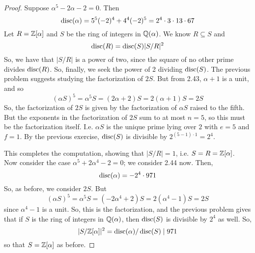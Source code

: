 \begin{proof}
	Suppose $\alpha^5 - 2\alpha - 2 = 0$. Then
	\[ \operatorname{disc}(\alpha) = 5^5(-2)^4 + 4^4(-2)^5 = 2^4 \cdot 3 \cdot 13 \cdot 67 \]
	Let $R = \mathbb{Z}[\alpha]$ and $S$ be the ring of integers in $\mathbb{Q}(\alpha)$. We know $R \subseteq S$ and
	\[ \operatorname{disc}(R) = \operatorname{disc}(S)|S/R|^2 \]
	So, we have that $|S/R|$ is a power of two, since the square of no other prime divides $\operatorname{disc}(R)$. So, finally, we seek the power of 2 dividing $\operatorname{disc}(S)$. The previous problem suggests studying the factorization of $2S$. But from 2.43, $\alpha+1$ is a unit, and so
	\[ (\alpha S)^5 = \alpha^5S = (2\alpha+2)S = 2(\alpha+1)S = 2S \]
	So, the factorization of $2S$ is given by the factorization of $\alpha S$ raised to the fifth. But the exponents in the factorization of $2S$ sum to at most $n=5$, so this must be the factorization itself. I.e. $\alpha S$ is the unique prime lying over $2$ with $e=5$ and $f=1$. By the previous exercise, $\operatorname{disc}(S)$ is divisible by $2^{(5-1) \cdot 1} = 2^4$.
	
	This completes the computation, showing that $|S/R| = 1$, i.e. $S = R = \mathbb{Z}[\alpha]$. \\
	
	Now consider the case $\alpha^5+2\alpha^4-2 = 0$; we consider 2.44 now. Then,
	\[ \operatorname{disc}(\alpha) = -2^4 \cdot 971 \]
	So, as before, we consider $2S$. But
	\[ (\alpha S)^5 = \alpha^5S = (-2\alpha^4+2)S = 2(\alpha^4-1)S = 2S \]
	since $\alpha^4-1$ is a unit. So, this is the factorization, and the previous problem gives that if $S$ is the ring of integers in $\mathbb{Q}(\alpha)$, then $\operatorname{disc}(S)$ is divisible by $2^4$ as well. So,
	\[ |S/\mathbb{Z}[\alpha]|^2 = \operatorname{disc}(\alpha)/\operatorname{disc}(S) \mid 971 \]
	so that $S = \mathbb{Z}[\alpha]$ as before.
\end{proof}
